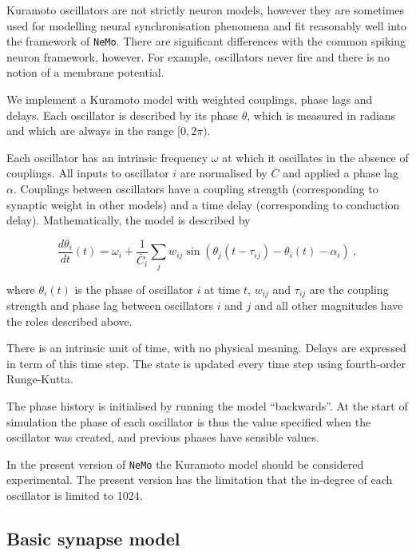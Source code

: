 \documentclass[a4paper]{article}
\newcommand{\nemo}{\texttt{NeMo}\xspace}
\begin{document}
Kuramoto oscillators \cite{Kuramoto1984} are not strictly neuron models,
however they are sometimes used for modelling neural synchronisation phenomena
and fit reasonably well into the framework of \nemo. There are significant
differences with the common spiking neuron framework, however. For example,
oscillators never fire and there is no notion of a membrane potential.

We implement a Kuramoto model with weighted couplings, phase lags and delays.
Each oscillator is described by its phase $\theta$, which is measured in
radians and which are always in the range $[0, 2\pi)$.
  
Each oscillator has an intrinsic frequency $\omega$ at which it oscillates in
the absence of couplings. All inputs to oscillator $i$ are normalised by
$\bar{C}$ and applied a phase lag $\alpha$.  Couplings between oscillators
have a coupling strength (corresponding to synaptic weight in other models)
and a time delay (corresponding to conduction delay). Mathematically, the
model is described by

\begin{equation}
  \frac{d\theta_i}{dt}(t) = \omega_i + \frac{1}{\bar{C}_i} \sum_{j} w_{ij} \sin(\theta_j(t-\tau_{ij}) - \theta_i(t) - \alpha_i) ~,
\end{equation}

where $\theta_i(t)$ is the phase of oscillator $i$ at time $t$, $w_{ij}$ and
$\tau_{ij}$ are the coupling strength and phase lag between oscillators $i$ and
$j$ and all other magnitudes have the roles described above.

There is an intrinsic unit of time, with no physical meaning. Delays are
expressed in term of this time step. The state is updated every time step using
fourth-order Runge-Kutta.

The phase history is initialised by running the model ``backwards''. At the
start of simulation the phase of each oscillator is thus the value specified
when the oscillator was created, and previous phases have sensible values.

In the present version of \nemo the Kuramoto model should be considered
experimental. The present version has the limitation that the in-degree of
each oscillator is limited to 1024.

\subsection{Basic synapse model}
\label{sec:synapse}
\end{document}
